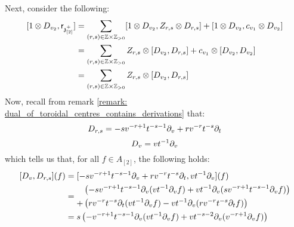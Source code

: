 \begin{remark}
\begin{enumerate}
\begin{enumerate}
\begin{enumerate}
                            Next, consider the following:
                                $$
                                    \begin{aligned}
                                        [1 \tensor D_{v_2}, \sfr_{\z_{[2]}^+}] & = \sum_{(r, s) \in \Z \x \Z_{> 0}} [1 \tensor D_{v_2}, Z_{r, s} \tensor D_{r, s}] + [1 \tensor D_{v_2}, c_{v_1} \tensor D_{v_2}]
                                        \\
                                        & = \sum_{(r, s) \in \Z \x \Z_{> 0}} Z_{r, s} \tensor [D_{v_2}, D_{r, s}] + c_{v_1} \tensor [D_{v_2}, D_{v_2}]
                                        \\
                                        & = \sum_{(r, s) \in \Z \x \Z_{> 0}} Z_{r, s} \tensor [D_{v_2}, D_{r, s}]
                                    \end{aligned}
                                $$
                            Now, recall from remark \ref{remark: dual_of_toroidal_centres_contains_derivations} that:
                                $$D_{r, s} = -s v^{-r + 1} t^{-s - 1} \del_v + r v^{-r} t^{-s} \del_t$$
                                $$D_v = v t^{-1} \del_v$$
                            which tells us that, for all $f \in A_{[2]}$, the following holds:
                                $$
                                    \begin{aligned}
                                        [D_v, D_{r, s}](f) & = [-s v^{-r + 1} t^{-s - 1} \del_v + r v^{-r} t^{-s} \del_t, v t^{-1} \del_v](f)
                                        \\
                                        & = 
                                        \begin{aligned}
                                            & \left( -s v^{-r + 1} t^{-s - 1} \del_v( v t^{-1} \del_v f ) + v t^{-1} \del_v( s v^{-r + 1} t^{-s - 1} \del_v f ) \right)
                                            \\
                                            + & \left( r v^{-r} t^{-s} \del_t( v t^{-1} \del_v f ) - v t^{-1} \del_v( r v^{-r} t^{-s} \del_t f ) \right)
                                        \end{aligned}
                                        \\
                                        & = 
                                        \begin{aligned}
                                            & s \left( -v^{-r + 1} t^{-s - 1} \del_v( v t^{-1} \del_v f ) + v t^{-s - 2} \del_v( v^{-r + 1} \del_v f ) \right)

\end{aligned}
\end{aligned}$$
\end{enumerate}
\end{enumerate}
\end{enumerate}
\end{remark}
